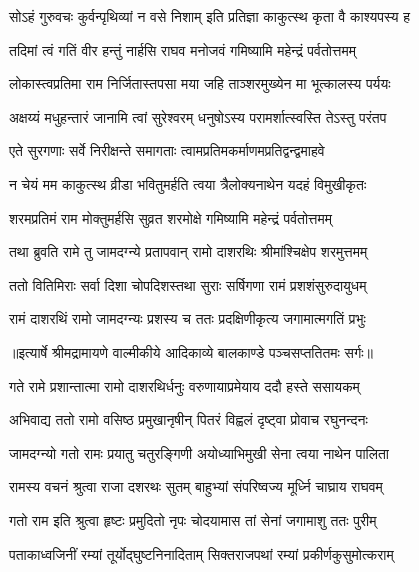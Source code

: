 \twolineshloka
{सोऽहं गुरुवचः कुर्वन्पृथिव्यां न वसे निशाम्}
{इति प्रतिज्ञा काकुत्स्थ कृता वै काश्यपस्य ह} %

\twolineshloka
{तदिमां त्वं गतिं वीर हन्तुं नार्हसि राघव}
{मनोजवं गमिष्यामि महेन्द्रं पर्वतोत्तमम्} %

\twolineshloka
{लोकास्त्वप्रतिमा राम निर्जितास्तपसा मया}
{जहि ताञ्शरमुख्येन मा भूत्कालस्य पर्ययः} %

\twolineshloka
{अक्षय्यं मधुहन्तारं जानामि त्वां सुरेश्वरम्}
{धनुषोऽस्य परामर्शात्स्वस्ति तेऽस्तु परंतप} %

\twolineshloka
{एते सुरगणाः सर्वे निरीक्षन्ते समागताः}
{त्वामप्रतिमकर्माणमप्रतिद्वन्द्वमाहवे} %

\twolineshloka
{न चेयं मम काकुत्स्थ व्रीडा भवितुमर्हति}
{त्वया त्रैलोक्यनाथेन यदहं विमुखीकृतः} %

\twolineshloka
{शरमप्रतिमं राम मोक्तुमर्हसि सुव्रत}
{शरमोक्षे गमिष्यामि महेन्द्रं पर्वतोत्तमम्} %

\twolineshloka
{तथा ब्रुवति रामे तु जामदग्न्ये प्रतापवान्}
{रामो दाशरथिः श्रीमांश्चिक्षेप शरमुत्तमम्} %

\twolineshloka
{ततो वितिमिराः सर्वा दिशा चोपदिशस्तथा}
{सुराः सर्षिगणा रामं प्रशशंसुरुदायुधम्} %

\twolineshloka
{रामं दाशरथिं रामो जामदग्न्यः प्रशस्य च}
{ततः प्रदक्षिणीकृत्य जगामात्मगतिं प्रभुः} %


{॥इत्यार्षे श्रीमद्रामायणे वाल्मीकीये आदिकाव्ये बालकाण्डे पञ्चसप्ततितमः सर्गः॥}


\twolineshloka
{गते रामे प्रशान्तात्मा रामो दाशरथिर्धनुः}
{वरुणायाप्रमेयाय ददौ हस्ते ससायकम्} %

\twolineshloka
{अभिवाद्य ततो रामो वसिष्ठ प्रमुखानृषीन्}
{पितरं विह्वलं दृष्ट्वा प्रोवाच रघुनन्दनः} %

\twolineshloka
{जामदग्न्यो गतो रामः प्रयातु चतुरङ्गिणी}
{अयोध्याभिमुखी सेना त्वया नाथेन पालिता} %

\twolineshloka
{रामस्य वचनं श्रुत्वा राजा दशरथः सुतम्}
{बाहुभ्यां संपरिष्वज्य मूर्ध्नि चाघ्राय राघवम्} %

\twolineshloka
{गतो राम इति श्रुत्वा हृष्टः प्रमुदितो नृपः}
{चोदयामास तां सेनां जगामाशु ततः पुरीम्} %

\twolineshloka
{पताकाध्वजिनीं रम्यां तूर्योद्घुष्टनिनादिताम्}
{सिक्तराजपथां रम्यां प्रकीर्णकुसुमोत्कराम्} %

